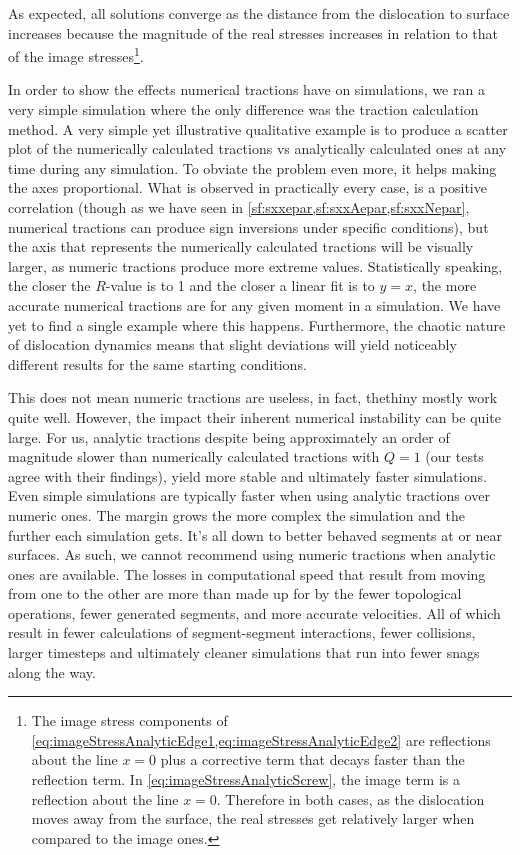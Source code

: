 \documentclass[11pt]{iopart}
\begin{document}
As expected, all solutions converge as the distance from the dislocation to surface increases because the magnitude of the real stresses increases in relation to that of the image stresses\footnote{The image stress components of \cref{eq:imageStressAnalyticEdge1,eq:imageStressAnalyticEdge2} are reflections about the line $x=0$ plus a corrective term that decays faster than the reflection term. In \cref{eq:imageStressAnalyticScrew}, the image term is a reflection about the line $x=0$. Therefore in both cases, as the dislocation moves away from the surface, the real stresses get relatively larger when compared to the image ones.}.

In order to show the effects numerical tractions have on simulations, we ran a very simple simulation where the only difference was the traction calculation method. A very simple yet illustrative qualitative example is to produce a scatter plot of the numerically calculated tractions vs analytically calculated ones at any time during any simulation. To obviate the problem even more, it helps making the axes proportional. What is observed in practically every case, is a positive correlation (though as we have seen in \cref{sf:sxxepar,sf:sxxAepar,sf:sxxNepar}, numerical tractions can produce sign inversions under specific conditions), but the axis that represents the numerically calculated tractions will be visually larger, as numeric tractions produce more extreme values. Statistically speaking, the closer the $R$-value is to 1 and the closer a linear fit is to $y=x$, the more accurate numerical tractions are for any given moment in a simulation. We have yet to find a single example where this happens. Furthermore, the chaotic nature of dislocation dynamics means that slight deviations will yield noticeably different results for the same starting conditions.

This does not mean numeric tractions are useless, in fact, thethiny mostly work quite well. However, the impact their inherent numerical instability can be quite large. For us, analytic tractions despite being approximately an order of magnitude slower than numerically calculated tractions with $Q = 1$ \cite{Queyreau} (our tests agree with their findings), yield more stable and ultimately faster simulations. Even simple simulations are typically faster when using analytic tractions over numeric ones. The margin grows the more complex the simulation and the further each simulation gets. It's all down to better behaved segments at or near surfaces. As such, we cannot recommend using numeric tractions when analytic ones are available. The losses in computational speed that result from moving from one to the other are more than made up for by the fewer topological operations, fewer generated segments, and more accurate velocities. All of which result in fewer calculations of segment-segment interactions, fewer collisions, larger timesteps and ultimately cleaner simulations that run into fewer snags along the way.
\end{document}
